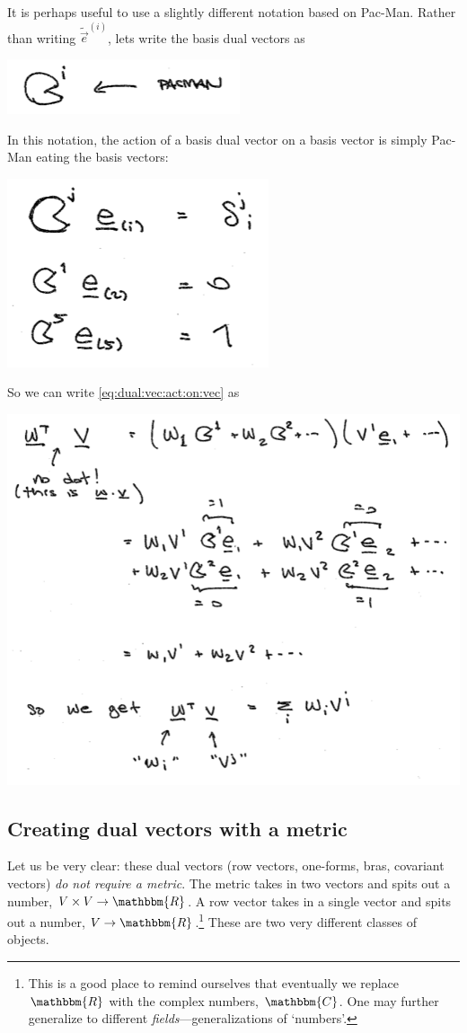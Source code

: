 \documentclass[
  11pt,
	colorful,
	raggedright,
]{tufte-style-thesis-flip}
\begin{document}
It is perhaps useful to use a slightly different notation based on Pac-Man. Rather than writing $\tilde{\vec{e}}^{(i)}$, lets write the basis dual vectors as
\begin{center}
\includegraphics[width=.4\textwidth]{figures/lec05_pacman.png}
\end{center}
In this notation, the action of a basis dual vector on a basis vector is simply Pac-Man eating the basis vectors:
\begin{center}
\includegraphics[width=.4\textwidth]{figures/lec05_paceats.png}
\end{center}
So we can write \eqref{eq:dual:vec:act:on:vec} as
\begin{center}
\includegraphics[width=.7\textwidth]{figures/lec05_paccontract.png}
\end{center}

\subsection{Creating dual vectors with a metric}

Let us be very clear: these dual vectors (row vectors, one-forms, bras, covariant vectors) \emph{do not require a metric}. The metric takes in two vectors and spits out a number, $V\times V\to \mathbbm{R}$. A row vector takes in a single vector and spits out a number, $V\to\mathbbm{R}$.\footnote{This is a good place to remind ourselves that eventually we replace $\mathbbm{R}$ with the complex numbers, $\mathbbm{C}$. One may further generalize to different \emph{fields}---generalizations of `numbers'.} These are two very different classes of objects. 
\end{document}
